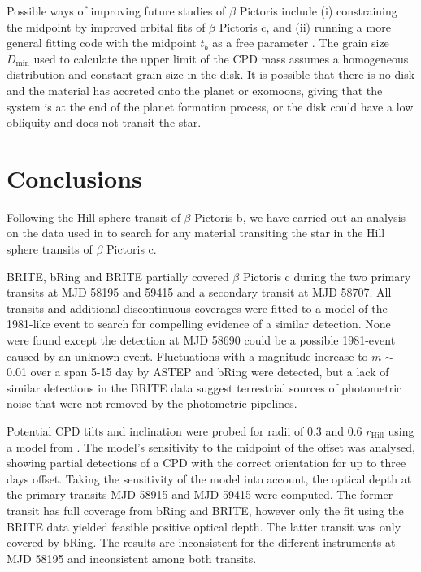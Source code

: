 \documentclass{aa}
\newcommand\picb{$\beta$ Pictoris b}
\newcommand\picc{$\beta$ Pictoris c}
\newcommand\pic{$\beta$ Pictoris}
\begin{document}
	Possible ways of improving future studies of \pic{} include (i) constraining the midpoint by improved orbital fits of \picc{}, and (ii) running a more general fitting code with the midpoint $t_b$ as a free parameter \citep[e.g. \texttt{emcee}; ][]{Foreman-Mackey_2013}.
	The grain size $D_{\text{min}}$ used to calculate the upper limit of the CPD mass assumes a homogeneous distribution and constant grain size in the disk. 
	It is possible that there is no disk and the material has accreted onto the planet or exomoons, giving that the system is at the end of the planet formation process, or the disk could have a low obliquity and does not transit the star. 
	
	\section{Conclusions}\label{sect:conc}
	Following the Hill sphere transit of \picb{}, we have carried out an analysis on the data used in \citet{Kenworthy_2021} to search for any material transiting the star in the Hill sphere transits of \picc{}.
	
	BRITE, bRing and BRITE partially covered \picc{} during the two primary transits at MJD 58195 and 59415 and a secondary transit at MJD 58707.
	All transits and additional discontinuous coverages were fitted to a model of the 1981-like event to search for compelling evidence of a similar detection.
	None were found except the detection at MJD 58690 could be a possible 1981-event caused by an unknown event.
	Fluctuations with a magnitude increase to $m \sim$ 0.01 over a span 5-15 day by ASTEP and bRing were detected, but a lack of similar detections in the BRITE data suggest terrestrial sources of photometric noise that were not removed by the photometric pipelines.
	
	Potential CPD tilts and inclination were probed for radii of 0.3 and 0.6 $r_{\text{Hill}}$ using a model from \citet{Kenworthy_2021}.
	The model's sensitivity to the midpoint of the offset was analysed, showing partial detections of a CPD with the correct orientation for up to three days offset.
	Taking the sensitivity of the model into account, the optical depth at the primary transits MJD 58915 and MJD 59415 were computed.
	The former transit has full coverage from bRing and BRITE, however only the fit using the BRITE data yielded feasible positive optical depth.
	The latter transit was only covered by bRing.
	The results are inconsistent for the different instruments at MJD 58195 and inconsistent among both transits.
	
\end{document}
